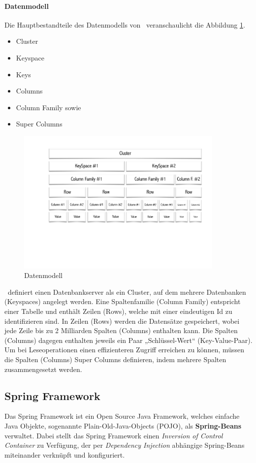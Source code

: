 \paragraph{Datenmodell}
Die Hauptbestandteile des Datenmodells von \cass\ veranschaulicht die Abbildung \ref{img:cassandraDataModel}.
\begin{itemize}
\item Cluster
\item Keyspace
\item Keys
\item Columns
\item Column Family sowie
\item Super Columns
\end{itemize}
\begin{figure}[H]
\centering
 \includegraphics[trim = 25mm 70mm 15mm 15mm, clip, width=0.9\textwidth]{resources/cassandra/cassandraDataModel}
\caption[Datenmodell]{Datenmodell}
\label{img:cassandraDataModel}
\end{figure}
\cass\ definiert einen Datenbankserver als ein Cluster, auf dem mehrere Datenbanken (Keyspaces) angelegt werden. Eine Spaltenfamilie (Column Family) entspricht einer Tabelle und enthält Zeilen (Rows), welche mit einer eindeutigen Id zu identifizieren sind. In Zeilen (Rows) werden die Datensätze gespeichert, wobei jede Zeile bis zu 2 Milliarden Spalten (Columns) enthalten kann. Die Spalten (Columns) dagegen enthalten jeweils ein Paar „Schlüssel-Wert“ (Key-Value-Paar). 
Um bei Leseoperationen einen effizienteren Zugriff erreichen zu können, müssen die Spalten (Columns) Super Columns definieren, indem mehrere Spalten zusammengesetzt werden.

\subsection{Spring Framework}
Das Spring Framework ist ein Open Source Java Framework, welches einfache Java Objekte, sogenannte Plain-Old-Java-Objects (POJO), als \textbf{Spring-Beans} verwaltet. Dabei stellt das Spring Framework einen \textit{Inversion of Control Container} zu Verfügung, der per \textit{Dependency Injection} abhängige Spring-Beans miteinander verknüpft und konfiguriert.

